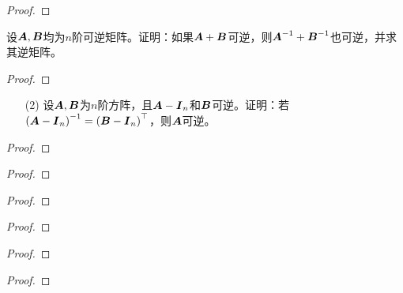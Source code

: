 \begin{problem}

\end{problem}
\begin{proof}

\end{proof}

\begin{problem}
设\(\boldsymbol{A},\boldsymbol{B}\)均为\(n\)阶可逆矩阵。证明：如果\(\boldsymbol{A}+\boldsymbol{B}\)可逆，则\({\boldsymbol{A}}^{-1}+{\boldsymbol{B}}^{-1}\)也可逆，并求其逆矩阵。
\end{problem}
\begin{proof}

\end{proof}

\begin{problem}
\begin{enumerate}
    \item[(2)]
        {
        设\(\boldsymbol{A},\boldsymbol{B}\)为\(n\)阶方阵，且\(\boldsymbol{A}-\boldsymbol{I}_n\)和\(\boldsymbol{B}\)可逆。证明：若\({\left( \boldsymbol{A}-\boldsymbol{I}_n \right)}^{-1}=\left( \boldsymbol{B}-\boldsymbol{I}_n \right)^\top\)，则\(\boldsymbol{A}\)可逆。
        }
\end{enumerate}
\end{problem}
\begin{proof}

\end{proof}

\begin{problem}

\end{problem}
\begin{proof}

\end{proof}

\begin{problem}

\end{problem}
\begin{proof}

\end{proof}

\begin{problem}

\end{problem}
\begin{proof}

\end{proof}

\begin{problem}

\end{problem}
\begin{proof}

\end{proof}

\begin{problem}

\end{problem}
\begin{proof}

\end{proof}